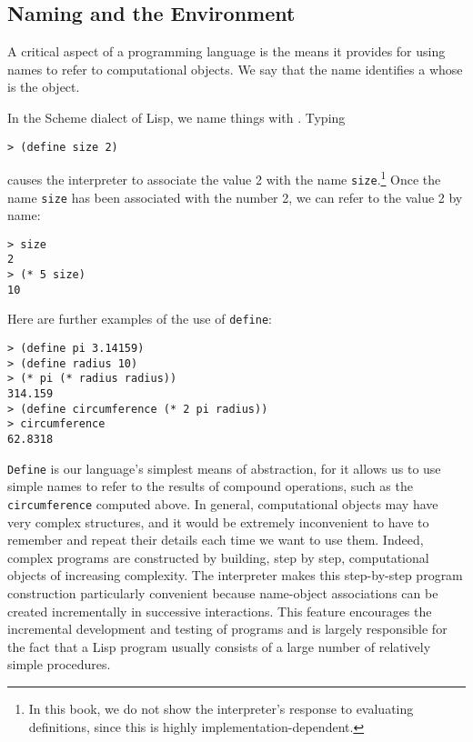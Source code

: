 \subsection{Naming and the Environment}
\label{sec:1.1.2}

A critical aspect of a programming language is the means it provides
for using names to refer to computational objects.  We say that the
name identifies a  whose  is the object.

In the Scheme dialect of Lisp, we name things with .
Typing

\begin{verbatim}
> (define size 2)
\end{verbatim}

\noindent causes the interpreter to associate the value 2 with the
name \texttt{size}.\footnote{In this book, we do not show the
  interpreter's response to evaluating definitions, since this is
  highly implementation-dependent.}  Once the name \texttt{size} has
been associated with the number 2, we can refer to the value 2 by
name:

\begin{verbatim}
> size
2
> (* 5 size)
10
\end{verbatim}

Here are further examples of the use of \texttt{define}:

\begin{verbatim}
> (define pi 3.14159)
> (define radius 10)
> (* pi (* radius radius))
314.159
> (define circumference (* 2 pi radius))
> circumference
62.8318
\end{verbatim}

\texttt{Define} is our language's simplest means of abstraction, for
it allows us to use simple names to refer to the results of compound
operations, such as the \texttt{circumference} computed above.  In
general, computational objects may have very complex structures, and
it would be extremely inconvenient to have to remember and repeat
their details each time we want to use them.  Indeed, complex programs
are constructed by building, step by step, computational objects of
increasing complexity. The interpreter makes this step-by-step program
construction particularly convenient because name-object associations
can be created incrementally in successive interactions.  This feature
encourages the incremental development and testing of programs and is
largely responsible for the fact that a Lisp program usually consists
of a large number of relatively simple procedures.

